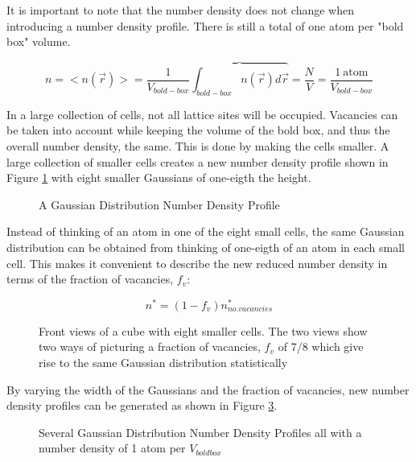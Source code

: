\documentclass[12pt]{article}
\begin{document}
It is important to note that the number density does not change when introducing a number density profile. There is still a total of one atom per "bold box" volume.

\begin{equation}{n=<n(\vec{r})>=\frac{1}{V_{bold-box}}\overbrace{\int_{bold-box}{n(\vec{r})}{d\vec{r}}}=\frac{N}{V}=\frac{1~\text{atom}}{V_{bold-box}}}\end{equation}

In a large collection of cells, not all lattice sites will be occupied. Vacancies can be taken into account while keeping the volume of the bold box, and thus the overall number density, the same. This is done by making the cells smaller. A large collection of smaller cells creates a new number density profile shown in Figure \ref{fig:Ensemble_Smallcells} with eight smaller Gaussians of one-eigth the height.

 \begin{figure}[h!]
    \centering
    \caption{A Gaussian Distribution Number Density Profile}
    \label{fig:Ensemble_Smallcells}
  \end{figure} 

Instead of thinking of an atom in one of the eight small cells, the same Gaussian distribution can be obtained from thinking of one-eigth of an atom in each small cell. This makes it convenient to describe the new reduced number density in terms of the fraction of vacancies, $f_v$: 

\begin{displaymath}{ n^* = (1-f_v){n_{no.vacancies}^*}}\end{displaymath} 

\begin{figure}[h!]
    \centering
    \caption{Front views of a cube with eight smaller cells. The two views show two ways of picturing a fraction of vacancies, $f_v$ of 7/8 which give rise to the same Gaussian distribution statistically}
    \label{fig:SameStatPic}
  \end{figure} 

By varying the width of the Gaussians and the fraction of vacancies, new number density profiles can be generated as shown in Figure \ref{fig:Ensemble_vary}.

\begin{figure}[h!]
    \centering
    \caption{Several Gaussian Distribution Number Density Profiles all with a number density of 1 atom per $V_{bold box}$}
    \label{fig:Ensemble_vary}
  \end{figure}  
\end{document}
